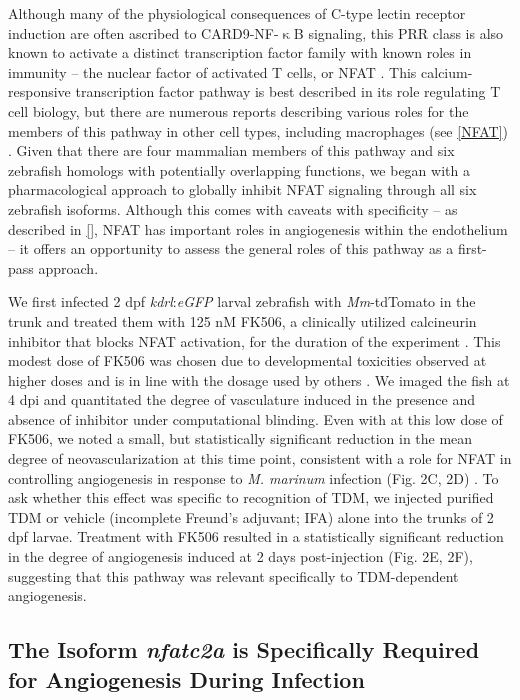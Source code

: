 Although many of the physiological consequences of C-type lectin receptor induction are often ascribed to CARD9-NF-$\upkappa$B signaling, this PRR class is also known to activate a distinct transcription factor family with known roles in immunity -- the nuclear factor of activated T cells, or NFAT \citep{Goodridge2007, Deerhake2021}. This calcium-responsive transcription factor pathway is best described in its role regulating T cell biology, but there are numerous reports describing various roles for the members of this pathway in other cell types, including macrophages (see \autoref{NFAT}) \citep{Symes1998, Jones2000, Crabtree2002, Horsley2002, Elloumi2012}. Given that there are four mammalian members of this pathway and six zebrafish homologs with potentially overlapping functions, we began with a pharmacological approach to globally inhibit NFAT signaling through all six zebrafish isoforms. Although this comes with caveats with specificity -- as described in \autoref{}, NFAT has important roles in angiogenesis within the endothelium -- it offers an opportunity to assess the general roles of this pathway as a first-pass approach. 

We first infected 2 dpf \textit{kdrl}:\textit{eGFP} larval zebrafish with \textit{Mm}-tdTomato in the trunk and treated them with 125 nM FK506, a clinically utilized calcineurin inhibitor that blocks NFAT activation, for the duration of the experiment \citep{Ellis1995}. This modest dose of FK506 was chosen due to developmental toxicities observed at higher doses and is in line with the dosage used by others \citep{Kujawski2014}. We imaged the fish at 4 dpi and quantitated the degree of vasculature induced in the presence and absence of inhibitor under computational blinding. Even with at this low dose of FK506, we noted a small, but statistically significant reduction in the mean degree of neovascularization at this time point, consistent with a role for NFAT in controlling angiogenesis in response to \textit{M. marinum} infection (Fig. 2C, 2D) \citep{Kujawski2014}. To ask whether this effect was specific to recognition of TDM, we injected purified TDM or vehicle (incomplete Freund's adjuvant; IFA) alone into the trunks of 2 dpf larvae. Treatment with FK506 resulted in a statistically significant reduction in the degree of angiogenesis induced at 2 days post-injection (Fig. 2E, 2F), suggesting that this pathway was relevant specifically to TDM-dependent angiogenesis.

\subsection{The Isoform \textit{nfatc2a} is Specifically Required for Angiogenesis During Infection}

